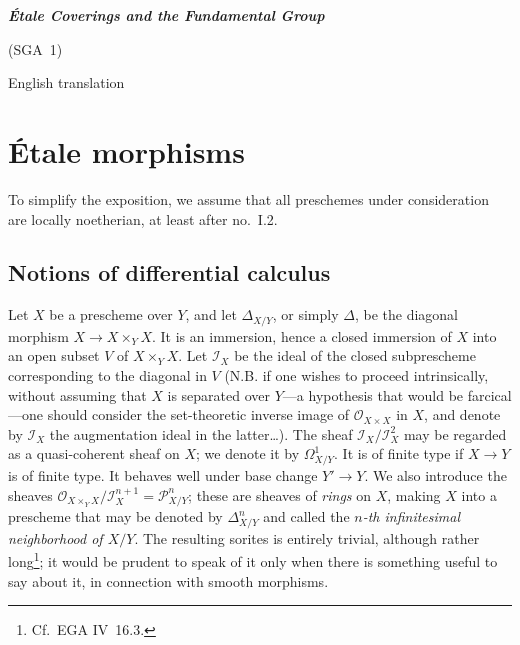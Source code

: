 \documentclass[11pt,oneside]{amsbook}
\theoremstyle{remark}
\theoremstyle{plain}
\numberwithin{equation}{section}
\begin{document}
\frontmatter
\begin{titlepage}
  \centering
  \vspace*{35mm}
  {\Huge\bfseries \textit{Étale Coverings and the Fundamental Group}\par}
  \vspace{3mm}
  {\LARGE (SGA~1)\par}
  \vspace{20mm}
  {\Large English translation\par}
  \vfill
\end{titlepage}

\tableofcontents

\mainmatter
\setcounter{chapter}{0}
\chapter{Étale morphisms}
\label{I}
To simplify the exposition, we assume that all preschemes under
consideration are locally noetherian, at least after no.~I.2.

\section{Notions of differential calculus}
\label{I.1}

Let \(X\) be a prescheme over \(Y\), and let \(\Delta_{X/Y}\), or simply
\(\Delta\),\label{indnot:ab} be the diagonal morphism
\(X\to X\times_Y X\).  It is an
immersion, hence a closed immersion of \(X\) into an open subset \(V\) of
\(X\times_Y X\).  Let \(\mathcal I_X\) be the ideal of the closed
subprescheme corresponding to the diagonal in \(V\) (N.B. if one wishes to
proceed intrinsically, without assuming that \(X\) is separated over
\(Y\)---a hypothesis that would be farcical---one should consider the
set-theoretic inverse image of \(\mathcal O_{X\times X}\) in \(X\), and
denote by \(\mathcal I_X\) the augmentation ideal in the latter\ldots).
The sheaf \(\mathcal I_X/\mathcal I_X^2\) may be regarded as a
quasi-coherent sheaf on \(X\); we denote it by \(\Omega^1_{X/Y}\).  It is
\label{indnot:ac}
of finite type if \(X\to Y\) is of finite type.  It behaves well under base
change \(Y'\to Y\).  We also introduce the sheaves
\(\mathcal O_{X\times_Y X}/\mathcal I_X^{n+1}=\mathcal P^n_{X/Y}\);\label{indnot:ad} these
are sheaves of \emph{rings} on \(X\), making \(X\) into a prescheme that
may be denoted by \(\Delta^n_{X/Y}\)\label{indnot:ae} and called the \emph{\(n\)-th
infinitesimal neighborhood of \(X/Y\)}.  The resulting sorites is entirely
trivial, although rather long\footnote{Cf.\ EGA IV~16.3.}; it would be
prudent to speak of it only when there is something useful to say about it,
in connection with smooth morphisms.
\end{document}
